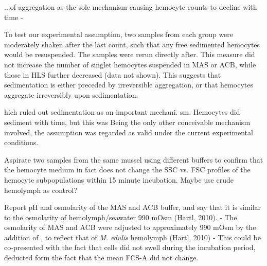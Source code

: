 
 ...of aggregation as the sole mechanism causing hemocyte counts to decline with time - 


 To test our experimental assumption, two samples from each group were moderately shaken after the last count, such that any free sedimented hemocytes would be resuspended. The samples were rerun directly after. This measure did not increase the number of singlet hemocytes suspended in MAS or ACB, while those in HLS further decreased (data not shown). This suggests that sedimentation is either preceded by irreversible aggregation, or that hemocytes aggregate irreversibly upon sedimentation. 

hich ruled out sedimentation as an important mechani. sm. Hemocytes did sediment with time, but this was Being the only other conceivable mechanism involved, the assumption was regarded as valid under the current experimental conditions.


Aspirate two samples from the same mussel using different buffers to confirm that the hemocyte medium in fact does not change the SSC vs. FSC profiles of the hemocyte subpopulations within 15 minute incubation. Maybe use crude hemolymph as control?
 

Report pH and osmolarity of the MAS and ACB buffer, and say that it is similar to the osmolarity of hemolymph/seawater 990 mOsm (Hartl, 2010).
- The osmolarity of MAS and ACB were adjusted to approximately 990 mOsm by the addition of , to reflect that of \emph{M. edulis} hemolymph (Hartl, 2010)
- This could be co-presented with the fact that cells did not swell during the incubation period, deducted form the fact that the mean FCS-A did not change.